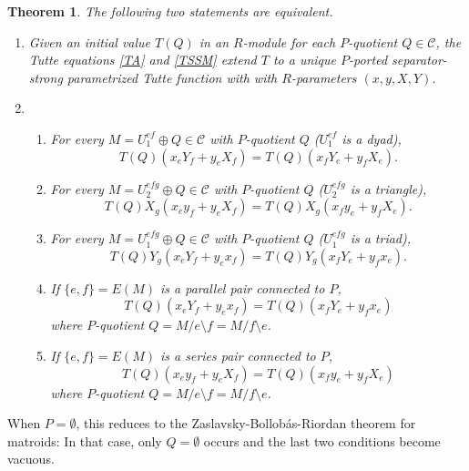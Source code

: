 \documentclass[12pt,leqno]{amsart}
\newtheorem{thm}[lem]{Theorem}
\theoremstyle{remark}
\begin{document}
\begin{thm}
\label{BigTheorem}
The following two statements are equivalent.
\begin{enumerate}
\item 
Given an initial value $T(Q)$ in an $R$-module for each
$P$-quotient $Q\in\mathcal{C}$, the Tutte equations
\eqref{TA} and \eqref{TSSM}
extend $T$ to a unique $P$-ported separator-strong
parametrized Tutte function with
with $R$-parameters $(x, y, X, Y)$.
\item
\begin{enumerate}
\item For every $M=U^{ef}_1\oplus Q\in\mathcal{C}$ with 
$P$-quotient $Q$ ($U^{ef}_1$ is a dyad), 
\[
T(Q)(x_e Y_f + y_e X_f) = 
T(Q)(x_f Y_e + y_f X_e).
\]
\item
For every $M=U^{efg}_2\oplus Q\in\mathcal{C}$ with 
$P$-quotient $Q$ ($U^{efg}_2$ is a triangle), 
\[
T(Q)X_g(x_e y_f + y_e X_f) = 
T(Q)X_g(x_f y_e + y_f X_e).
\]
\item
For every $M=U^{efg}_1\oplus Q\in\mathcal{C}$ with 
$P$-quotient $Q$  ($U^{efg}_1$ is a triad), 
\[
T(Q)Y_g(x_e Y_f + y_e x_f) = 
T(Q)Y_g(x_f Y_e + y_f x_e).
\]
\item
If $\{e,f\}=E(M)$ is a parallel pair connected to $P$, 
\[
T(Q)(x_e Y_f + y_e x_f) = 
T(Q)(x_f Y_e + y_f x_e)
\]
where $P$-quotient $Q=M/e\setminus f=M/f\setminus e$.
\item
If $\{e,f\}=E(M)$ is a series pair connected to $P$, 
\[
T(Q)(x_e y_f + y_e X_f) = 
T(Q)(x_f y_e + y_f X_e)
\]
where $P$-quotient $Q=M/e\setminus f=M/f\setminus e$.
\end{enumerate}
\end{enumerate}
\end{thm}

When $P=\emptyset$, this reduces to the
Zaslavsky-Bollob\'{a}s-Riordan theorem 
for matroids\cite{Ellis-Monaghan-Traldi}:
In that case, only $Q=\emptyset$ occurs and the last two conditions become
vacuous.
\end{document}
